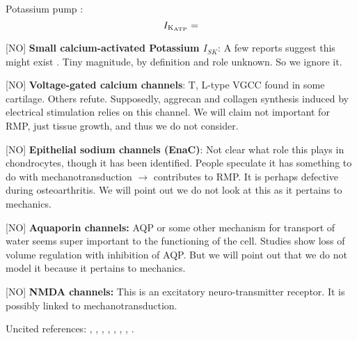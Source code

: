 Potassium pump \citep{UNKNOWN}:
\begin{equation}
  I_{\rm K_{ATP}} =
\end{equation}

[NO] {\bf Small calcium-activated Potassium $I_{SK}$}: A few reports
suggest this might exist \citep{Halletal1996,
  BarrettJolleyetal2010}. Tiny magnitude, by definition and role
unknown. So we ignore it.

[NO] {\bf Voltage-gated calcium channels}: T, L-type VGCC found in
some cartilage. Others refute. Supposedly, aggrecan and collagen
synthesis induced by electrical stimulation relies on this channel. We
will claim not important for RMP, just tissue growth, and thus we do
not consider.

[NO] {\bf Epithelial sodium channels (EnaC)}: Not clear what role this
plays in chondrocytes, though it has been identified. People speculate
it has something to do with mechanotransduction $\rightarrow$
contributes to RMP. It is perhaps defective during osteoarthritis. We
will point out we do not look at this as it pertains to mechanics.

[NO] {\bf Aquaporin channels:} AQP or some other mechanism for
transport of water seems super important to the functioning of the
cell. Studies show loss of volume regulation with inhibition of
AQP. But we will point out that we do not model it because it pertains
to mechanics.

[NO] {\bf NMDA channels:} This is an excitatory neuro-transmitter
receptor. It is possibly linked to mechanotransduction.


Uncited references:
\cite{ArcherWest2003},
\cite{Grishkoetal2010},
\cite{Hille2001},
\cite{LesageLazdunski2000},
\cite{MillwardSadleretal2000},
\cite{Nygrenetal1998},
\cite{Scholz2002},
\cite{Tsugaetal2001}.

